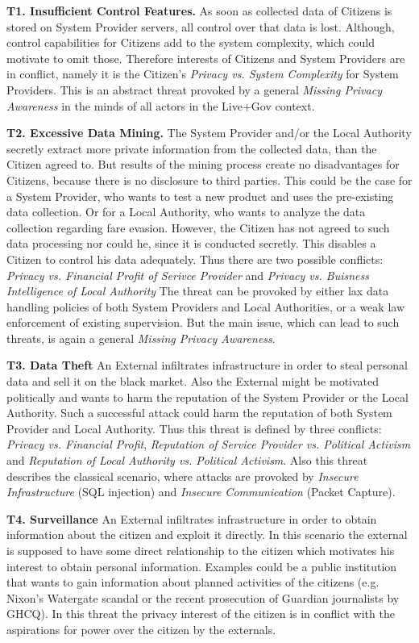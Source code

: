 \documentclass[runningheads,a4paper]{llncs}
\begin{document}
\textbf{T1. Insufficient Control Features.}
As soon as collected data of Citizens is stored on System Provider servers, all control over that data is lost. Although, control capabilities for Citizens add to the system complexity, which could motivate to omit those. Therefore interests of Citizens and System Providers are in conflict, namely it is the Citizen's \textit{Privacy vs. System Complexity} for System Providers. This is an abstract threat provoked by a general \textit{Missing Privacy Awareness} in the minds of all actors in the Live+Gov context.

\textbf{T2. Excessive Data Mining.}
The System Provider and/or the Local Authority secretly extract more private information from the collected data, than the Citizen agreed to.
But results of the mining process create no disadvantages for Citizens, because there is no disclosure to third parties.
This could be the case for a System Provider, who wants to test a new product and uses the pre-existing data collection.
Or for a Local Authority, who wants to analyze the data collection regarding fare evasion.
However, the Citizen has not agreed to such data processing nor could he, since it is conducted secretly.
This disables a Citizen to control his data adequately.
Thus there are two possible conflicts: \textit{Privacy vs. Financial Profit of Serivce Provider} and  \textit{Privacy vs. Buisness Intelligence of Local Authority}
The threat can be provoked by either lax data handling policies of both System Providers and Local Authorities, or a weak law enforcement of existing supervision.
But the main issue, which can lead to such threats, is again a general \textit{Missing Privacy Awareness}.

\textbf{T3. Data Theft}
An External infiltrates infrastructure in order to steal personal data and sell it on the black market. Also the External might be motivated politically and wants to harm the reputation of the System Provider or the Local Authority. Such a successful attack could harm the reputation of both System Provider and Local Authority. Thus this threat is defined by three conflicts: \textit{Privacy vs. Financial Profit}, \textit{Reputation of Service Provider vs. Political Activism} and \textit{Reputation of Local Authority vs. Political Activism}.
Also this threat describes the classical scenario, where attacks are provoked by \textit{Insecure Infrastructure} (SQL injection) and \textit{Insecure Communication} (Packet Capture).

\textbf{T4. Surveillance}
An External infiltrates infrastructure in order to obtain information
about the citizen and exploit it directly.  In this scenario the
external is supposed to have some direct relationship to the citizen
which motivates his interest to obtain personal information.  Examples
could be a public institution that wants to gain information about
planned activities of the citizens (e.g. Nixon's Watergate scandal or
the recent prosecution of Guardian journalists by GHCQ). 
In this threat the privacy interest of the citizen is in conflict with
the aspirations for power over the citizen by the externals.
\end{document}
